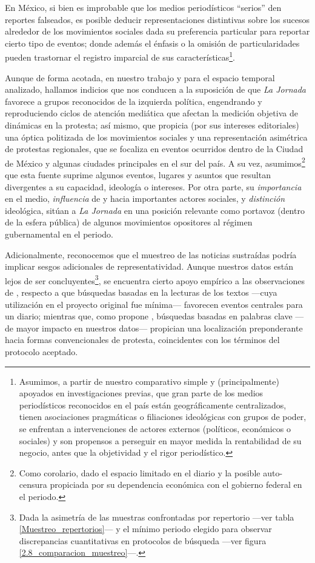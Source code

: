 \documentclass[letterpaper, 11pt]{book}
\theoremstyle{definition}
\theoremstyle{remark}
\begin{document}
En México, si bien es improbable que los medios periodísticos ``serios'' den reportes falseados, es posible deducir representaciones distintivas sobre los sucesos alrededor de los movimientos sociales dada su preferencia particular para reportar cierto tipo de eventos; donde además el énfasis o la omisión de particularidades pueden trastornar el registro imparcial de sus características\footnote{
    Asumimos, a partir de nuestro comparativo simple y (principalmente) apoyados en investigaciones previas, que gran parte de los medios periodísticos reconocidos en el país están geográficamente centralizados, tienen asociaciones pragmáticas o filiaciones ideológicas con grupos de poder, se enfrentan a intervenciones de actores externos (políticos, económicos o sociales) y son propensos a perseguir en mayor medida la rentabilidad de su negocio, antes que la objetividad y el rigor periodístico. 
}. 


Aunque de forma acotada, en nuestro trabajo y para el espacio temporal analizado, hallamos indicios que nos conducen a la suposición de que \emph{La Jornada} favorece a grupos reconocidos de la izquierda política, engendrando y reproduciendo ciclos de atención mediática que afectan la medición objetiva de dinámicas en la protesta; así mismo, que propicia (por sus intereses editoriales) una óptica politizada de los movimientos sociales y una representación asimétrica de protestas regionales, que se focaliza en eventos ocurridos dentro de la Ciudad de México y algunas ciudades principales en el sur del país. 
A su vez, asumimos\footnote{
    Como corolario, dado el espacio limitado en el diario y la posible auto-censura propiciada por su dependencia económica con el gobierno federal en el periodo. 
} que esta fuente suprime algunos eventos, lugares y asuntos que resultan divergentes a su capacidad, ideología o intereses. 
Por otra parte, su \emph{importancia} en el medio, \emph{influencia} de y hacia importantes actores sociales, y \emph{distinción} ideológica, sitúan a \emph{La Jornada} en una posición relevante como portavoz (dentro de la esfera pública) de algunos movimientos opositores al régimen gubernamental en el periodo. 


Adicionalmente, reconocemos que el muestreo de las noticias sustraídas podría implicar sesgos adicionales de representatividad. 
Aunque nuestros datos están lejos de ser concluyentes\footnote{
    Dada la asimetría de las muestras confrontadas por repertorio ---ver tabla \ref{Muestreo_repertorios}--- y el mínimo periodo elegido para observar discrepancias cuantitativas en protocolos de búsqueda ---ver figura \ref{2.8_comparacion_muestreo}---.
}, se encuentra cierto apoyo empírico a las observaciones de \citet{2001_Maney_Oliver__FindingEvents}, respecto a que búsquedas basadas en la lecturas de los textos ---cuya utilización en el proyecto original fue mínima--- favorecen eventos centrales para un diario; mientras que, como propone \citet{2010_Strawn_keywordSearch}, búsquedas basadas en palabras clave ---de mayor impacto en nuestros datos--- propician una localización preponderante hacia formas convencionales de protesta, coincidentes con los términos del protocolo aceptado. 
\end{document}
